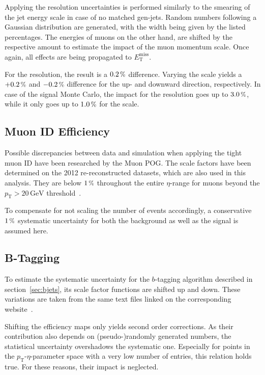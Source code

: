 Applying the resolution uncertainties is performed similarly to the smearing of the jet energy scale in case of no matched gen-jets. Random numbers following a Gaussian distribution are generated, with the width being given by the listed percentages. The energies of muons on the other hand, are shifted by the respective amount to estimate the impact of the muon momentum scale. Once again, all effects are being propagated to $E_{\text{T}}^{\text{miss}}$.

For the resolution, the result is a $0.2\,\pct$ difference. Varying the scale yields a $+0.2\,\pct$ and $-0.2\,\pct$ difference for the up- and downward direction, respectively. In case of the signal Monte Carlo, the impact for the resolution goes up to $3.0\,\pct$, while it only goes up to $1.0\,\pct$ for the scale.


\subsection{Muon  ID Efficiency}
\label{sec:muonidsys}

Possible discrepancies between data and simulation when applying the tight muon ID have been researched by the Muon POG. The scale factors have been determined on the 2012 re-reconstructed datasets, which are also used in this analysis. They are below $1\,\pct$ throughout the entire $\eta$-range for muons beyond the $p_{\text{T}} > 20\,\text{GeV}$ threshold~\cite{muonideff}. 

To compensate for not scaling the number of events accordingly, a conservative $1\,\pct$ systematic uncertainty for both the background as well as the signal is assumed here.


\subsection{B-Tagging}
\label{sec:btagsys}

To estimate the systematic uncertainty for the $b$-tagging algorithm described in section~\ref{sec:bjets}, its scale factor functions are shifted up and down. These variations are taken from the same text files linked on the corresponding website~\cite{btagtwiki}.

Shifting the efficiency maps only yields second order corrections. As their contribution also depends on (pseudo-)randomly generated numbers, the statistical uncertainty overshadows the systematic one. Especially for points in the $p_{\text{T}}$-$\eta$-parameter space with a very low number of entries, this relation holds true. For these reasons, their impact is neglected.


